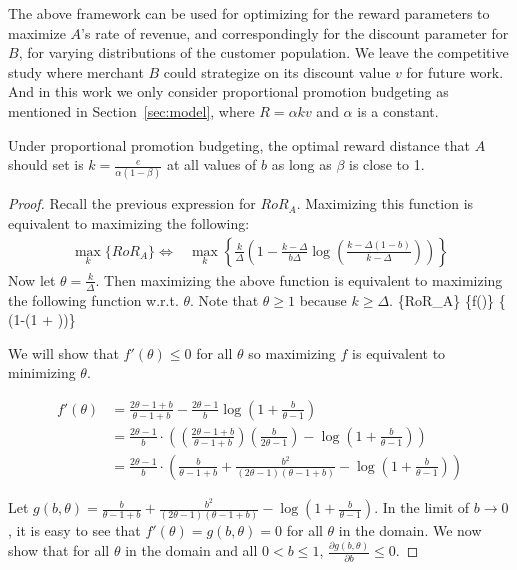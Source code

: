 The above framework can be used for optimizing for the reward parameters to maximize $A$'s rate of revenue, and correspondingly for the discount parameter for $B$, for varying distributions of the customer population.
We leave the competitive study where merchant $B$ could strategize on its discount value $v$ for future work.
And in this work we only consider proportional promotion budgeting as mentioned in Section~\ref{sec:model}, where $R = \alpha k v$ and $\alpha$ is a constant.

\begin{theorem}
Under proportional promotion budgeting, the optimal reward distance that $A$ should set is $k = \frac{e}{\alpha(1-\beta)}$ at all values of $b$ as long as $\beta$ is close to 1.
\end{theorem}
\begin{proof}
Recall the previous expression for $RoR_A$. Maximizing this function is equivalent to maximizing the following:
\begin{align*}
\underset{k}\max\{RoR_A\} \Leftrightarrow & \underset{k} \max\left\{\frac{k}{\Delta}\left(1-\frac{k-\Delta}{b\Delta}\log\left(\frac{k-\Delta(1-b)}{k-\Delta}\right)\right)\right\}
\end{align*}
Now let $\theta = \frac{k}{\Delta}$. Then maximizing the above function is equivalent to maximizing the following function w.r.t. $\theta$. Note that $\theta \geq 1$ because $k \geq \Delta$.
\beq\notag
{}\max\{RoR_A\} \Leftrightarrow \underset{\theta}\max\{f(\theta)\} \Leftrightarrow \underset{\theta}\max\left\{ \theta \left(1-\log\left(1 + \right)\right)\right\} 
\eeq

We will show that $f'(\theta) \leq 0$ for all $\theta$ so maximizing $f$ is equivalent to minimizing $\theta$.

\begin{align*}
f'(\theta) &= \frac{2\theta-1+b}{\theta-1+b} - \frac{2\theta-1}{b} \log \left(1+\frac{b}{\theta-1} \right) \\
&= \frac{2\theta-1}{b}\cdot\left(\left(\frac{2\theta-1+b}{\theta-1+b}\right)\left(\frac{b}{2\theta-1} \right) - \log \left(1+\frac{b}{\theta-1} \right)\right) \\
&= \frac{2\theta-1}{b}\cdot\left(\frac{b}{\theta-1+b}+\frac{b^2}{(2\theta-1)(\theta-1+b)} - \log \left(1+\frac{b}{\theta-1} \right)\right)
\end{align*}

Let $g(b, \theta) = \frac{b}{\theta-1+b}+\frac{b^2}{(2\theta-1)(\theta-1+b)} - \log \left(1+\frac{b}{\theta-1} \right)$. 
In the limit of $b \to 0$, it is easy to see that $f'(\theta) = g(b, \theta) = 0$ for all $\theta$ in the domain. 
We now show that for all $\theta$ in the domain and all $0 < b \leq 1$, $\frac{\partial g(b, \theta)}{\partial b} \leq 0$.


\end{proof}

